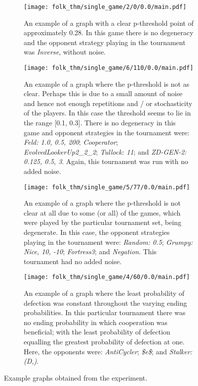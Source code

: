 \begin{figure}
    \centering
    \begin{subfigure}[0.45\textwidth]
        \centering
        \texttt{[image: folk\_thm/single\_game/2/0/0.0/main.pdf]}
        \caption{An example of a graph with a clear p-threshold point of approximately 0.28. In this game there is no degeneracy and the opponent strategy playing in the tournament was \textit{Inverse}, without noise.}\label{subfig:clear_thresh_plot}
    \end{subfigure}
    \begin{subfigure}[0.45\textwidth]
        \centering
        \texttt{[image: folk\_thm/single\_game/6/110/0.0/main.pdf]}
        \caption{An example of a graph where the p-threshold is not as clear. Perhaps this is due to a small amount of noise and hence not enough repetitions and / or stochasticity of the players. In this case the threshold seems to lie in the range [0.1, 0.3]. There is no degeneracy in this game and opponent strategies in the tournament were: \textit{Feld: 1.0, 0.5, 200}; \textit{Cooperator};  \textit{EvolvedLookerUp2_2_2}; \textit{Tullock: 11}; and \textit{ZD-GEN-2: 0.125, 0.5, 3}. Again, this tournament was run with no added noise.}\label{subfig:unclear_thresh_plot}
    \end{subfigure}
    \newline
    \begin{subfigure}[0.45\textwidth]
        \centering
        \texttt{[image: folk\_thm/single\_game/5/77/0.0/main.pdf]}
        \caption{An example of a graph where the p-threshold is not clear at all due to some (or all) of the games, which were played by the particular tournament set, being degenerate. In this case, the opponent strategies playing in the tournament were: \textit{Random: 0.5}; \textit{Grumpy: Nice, 10, -10}; \textit{Fortress3}; and \textit{Negation}. This tournament had no added noise.}\label{subfig:degenerate_plot}
    \end{subfigure}
    \begin{subfigure}[0.45\textwidth]
        \centering
        \texttt{[image: folk\_thm/single\_game/4/60/0.0/main.pdf]}
        \caption{An example of a graph where the least probability of defection
        was constant throughout the varying ending probabilities. In this
        particular tournament there was no ending probability in which
        cooperation was beneficial; with the least probability of defection
        equalling the greatest probability of defection at one. Here, the
        opponents were: \textit{AntiCycler}; \textit{\$e\$}; and
        \textit{Stalker: (D,)}.}\label{subfig:constant_plot}
    \end{subfigure}
    \caption{Example graphs obtained from the experiment.}\label{fig:example_graphs}
\end{figure}


